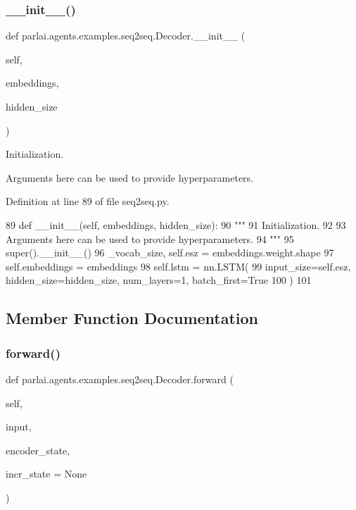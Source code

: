 \subsubsection{\texorpdfstring{\+\_\+\+\_\+init\+\_\+\+\_\+()}{\_\_init\_\_()}}
{\footnotesize\ttfamily def parlai.\+agents.\+examples.\+seq2seq.\+Decoder.\+\_\+\+\_\+init\+\_\+\+\_\+ (\begin{DoxyParamCaption}\item[{}]{self,  }\item[{}]{embeddings,  }\item[{}]{hidden\+\_\+size }\end{DoxyParamCaption})}

\begin{DoxyVerb}Initialization.

Arguments here can be used to provide hyperparameters.
\end{DoxyVerb}
 

Definition at line 89 of file seq2seq.\+py.


\begin{DoxyCode}
89     \textcolor{keyword}{def }\_\_init\_\_(self, embeddings, hidden\_size):
90         \textcolor{stringliteral}{"""}
91 \textcolor{stringliteral}{        Initialization.}
92 \textcolor{stringliteral}{}
93 \textcolor{stringliteral}{        Arguments here can be used to provide hyperparameters.}
94 \textcolor{stringliteral}{        """}
95         super().\_\_init\_\_()
96         \_vocab\_size, self.esz = embeddings.weight.shape
97         self.embeddings = embeddings
98         self.lstm = nn.LSTM(
99             input\_size=self.esz, hidden\_size=hidden\_size, num\_layers=1, batch\_first=\textcolor{keyword}{True}
100         )
101 
\end{DoxyCode}


\subsection{Member Function Documentation}
\mbox{\label{classparlai_1_1agents_1_1examples_1_1seq2seq_1_1Decoder_a21c8ac2081cfc42ca7823f6640f40855}} 
\subsubsection{\texorpdfstring{forward()}{forward()}}
{\footnotesize\ttfamily def parlai.\+agents.\+examples.\+seq2seq.\+Decoder.\+forward (\begin{DoxyParamCaption}\item[{}]{self,  }\item[{}]{input,  }\item[{}]{encoder\+\_\+state,  }\item[{}]{incr\+\_\+state = {\ttfamily None} }\end{DoxyParamCaption})}

